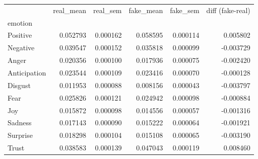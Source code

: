\begin{tabular}{lrrrrr}
\toprule
 & real_mean & real_sem & fake_mean & fake_sem & diff (fake-real) \\
emotion &  &  &  &  &  \\
\midrule
Positive & 0.052793 & 0.000162 & 0.058595 & 0.000114 & 0.005802 \\
Negative & 0.039547 & 0.000152 & 0.035818 & 0.000099 & -0.003729 \\
Anger & 0.020356 & 0.000100 & 0.017936 & 0.000075 & -0.002420 \\
Anticipation & 0.023544 & 0.000109 & 0.023416 & 0.000070 & -0.000128 \\
Disgust & 0.011953 & 0.000088 & 0.008156 & 0.000043 & -0.003797 \\
Fear & 0.025826 & 0.000121 & 0.024942 & 0.000098 & -0.000884 \\
Joy & 0.015872 & 0.000098 & 0.014556 & 0.000057 & -0.001316 \\
Sadness & 0.017143 & 0.000090 & 0.015222 & 0.000064 & -0.001921 \\
Surprise & 0.018298 & 0.000104 & 0.015108 & 0.000065 & -0.003190 \\
Trust & 0.038583 & 0.000139 & 0.047043 & 0.000119 & 0.008460 \\
\bottomrule
\end{tabular}

